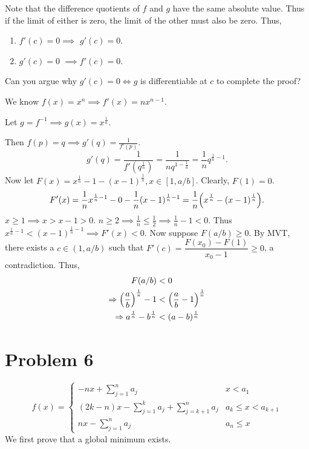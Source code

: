 \documentclass[12pt]{article}
\begin{document}
Note that the difference quotients of $f$ and $g$ have the same absolute value. Thus if the limit of either is zero, the limit of the other must also be zero.
Thus,
\begin{enumerate}[label=(\roman*)]
    \item $f'(c) = 0 \implies$ \textcolor{exercise}{$g'(c) = 0$}.
    \item \textcolor{exercise}{$g'(c) = 0$} $\implies f'(c) = 0$.
\end{enumerate}
Can you argue why $g'(c) = 0 \iff g$ is differentiable at $c$ to complete the proof?

\begin{problem}
    
\end{problem}
We know $f(x) = x^{n} \implies f'(x) = n x^{n-1}$.

Let $g = f^{-1} \implies g(x) = x^{\frac{1}{n}}$.

Then $f(p) = q \implies g'(q) = \frac{1}{f'(p)}$. \[
    g'(q) = \frac{1}{f'(q^{\frac{1}{n}})} = \frac{1}{n q^{1 - \frac{1}{n}}} = \frac{1}{n} q^{\frac{1}{n} - 1}.
\] Now let $F(x) = x^{\frac{1}{n}} - 1 - (x - 1)^{\frac{1}{n}}, x \in [1, a/b]$.
Clearly, $F(1) = 0$. \[
    F'(x) = \frac{1}{n} x^{\frac{1}{n} - 1} - 0 - \frac{1}{n} (x - 1)^{\frac{1}{n} - 1} = \frac{1}{n} \paren{x^{\frac{1}{n}} - (x - 1)^{\frac{1}{n}}}.
\] $x \geq 1 \implies x > x - 1 > 0$.
$n \geq 2 \implies \frac{1}{n} \leq \frac{1}{2} \implies \frac{1}{n} - 1 < 0$.
Thus $x^{\frac{1}{n} - 1} < (x - 1)^{\frac{1}{n} - 1} \implies F'(x) < 0$.
Now suppose $F(a / b) \geq 0$.
By MVT, there exists a $c \in (1, a/b)$ such that $F'(c) = \dfrac{F(x_{0}) - F(1)}{x_{0} - 1} \geq 0$, a contradiction. Thus,
\begin{align*}
    F(a / b) &< 0 \\
    \implies \paren{\frac{a}{b}}^{\frac{1}{n}} - 1 &< \paren{\frac{a}{b} - 1}^{\frac{1}{n}} \\
    \implies a^{\frac{1}{n}} - b^{\frac{1}{n}} &< (a - b)^{\frac{1}{n}}
\end{align*}

\section*{Problem 6}
\[
    f(x) = 
    \begin{cases}
        - nx + \sum_{j = 1}^{n} a_{j} & x < a_{1} \\
        (2k - n) x - \sum_{j = 1}^{k} a_{j} + \sum_{j = k + 1}^{n} a_{j} & a_{k} \leq x < a_{k+1} \\
        nx - \sum_{j = 1}^{n} a_{j} & a_{n} \leq x
    \end{cases}
\]
We first prove that a global minimum exists.
\end{document}
